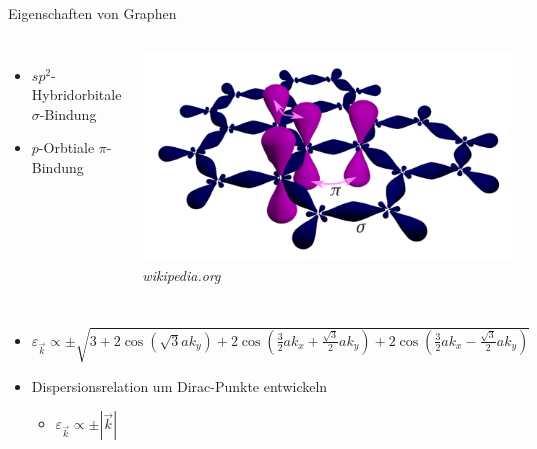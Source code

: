 \documentclass[aspectratio=1610, 9pt, xcolor=dvipsnames]{beamer}
\begin{document}
\begin{frame}{Eigenschaften von Graphen}
\begin{columns}
  \begin{itemize}
      \item $sp^2$-Hybridorbitale {\color{tugreen} \textrightarrow} $\sigma$-Bindung 
      \item $p$-Orbtiale {\color{tugreen} \textrightarrow} $\pi$-Bindung
      \end{itemize}
  \centering
    \includegraphics[width=\textwidth]{Plots/orbitals.png}
    \hspace*{15pt}\hbox{\scriptsize {\footnotesize\itshape wikipedia.org}}
  \end{columns}
  \begin{columns}
  \pause 
  \begin{itemize}
    \vspace*{-2cm}
      \item 
      $\varepsilon_{\vec{k}} \propto \pm \sqrt{3+2 \cos \left ( \sqrt{3}ak_y \right )+2\cos \left ( \frac{3}{2}ak_x+\frac{\sqrt{3}}{2}ak_y \right ) + 2\cos \left ( \frac{3}{2}ak_x-\frac{\sqrt{3}}{2}ak_y \right ) }$
    \item Dispersionsrelation um Dirac-Punkte entwickeln
      \begin{itemize}
        \item[\textrightarrow] $\varepsilon_{\vec{k}} \propto \pm | \vec{k} |$
      \end{itemize}
    \end{itemize} 
    \vspace*{0.3cm}
    \centering
      \includegraphics[width=\textwidth]{Plots/dirac_cones.png}

\end{columns}
\end{frame}
\end{document}
